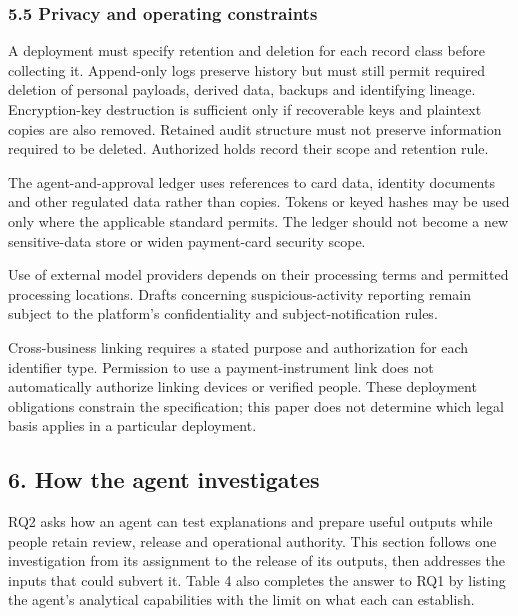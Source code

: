 \documentclass[
  11pt,
]{article}
\begin{document}
\hypertarget{privacy-and-operating-constraints}{%
\subsubsection{5.5 Privacy and operating
constraints}\label{privacy-and-operating-constraints}}

A deployment must specify retention and deletion for each record class
before collecting it. Append-only logs preserve history but must still
permit required deletion of personal payloads, derived data, backups and
identifying lineage. Encryption-key destruction is sufficient only if
recoverable keys and plaintext copies are also removed. Retained audit
structure must not preserve information required to be deleted.
Authorized holds record their scope and retention rule.

The agent-and-approval ledger uses references to card data, identity
documents and other regulated data rather than copies. Tokens or keyed
hashes may be used only where the applicable standard permits. The
ledger should not become a new sensitive-data store or widen
payment-card security scope.

Use of external model providers depends on their processing terms and
permitted processing locations. Drafts concerning suspicious-activity
reporting remain subject to the platform's confidentiality and
subject-notification rules.

Cross-business linking requires a stated purpose and authorization for
each identifier type. Permission to use a payment-instrument link does
not automatically authorize linking devices or verified people. These
deployment obligations constrain the specification; this paper does not
determine which legal basis applies in a particular deployment.

\FloatBarrier

\hypertarget{how-the-agent-investigates}{%
\subsection{6. How the agent
investigates}\label{how-the-agent-investigates}}

\suppressfloats[t]

RQ2 asks how an agent can test explanations and prepare useful outputs
while people retain review, release and operational authority. This
section follows one investigation from its assignment to the release of
its outputs, then addresses the inputs that could subvert it. Table 4
also completes the answer to RQ1 by listing the agent's analytical
capabilities with the limit on what each can establish.
\end{document}
